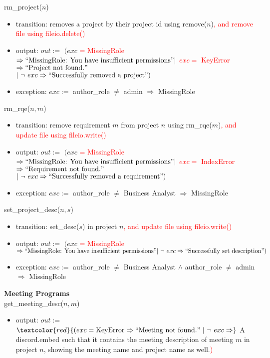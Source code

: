 \documentclass[12pt, titlepage]{article}
\begin{document}
\noindent rm\_project($n$)
\begin{itemize}
    \item transition: removes a project by their project id using remove($n$)\textcolor{red}{, and remove file using fileio.delete()}
    \item output: $out :=$ $(exc$ \textcolor{red}{= MissingRole} $\Rightarrow ``\text{MissingRole: You have insufficient permissions}"\\ |\ $\textcolor{red}{$exc =$ KeyError $\Rightarrow ``\text{Project not found.}"$}\\$|\ \lnot\ exc \Rightarrow ``\text{Successfully removed a project}")$
    \item exception: $exc :=$ author\_role $\neq$ admin $\Rightarrow$ MissingRole
\end{itemize}

\noindent rm\_rqe($n, m$)
\begin{itemize}
    \item transition: remove requirement $m$ from project $n$ using rm\_rqe($m$)\textcolor{red}{, and update file using fileio.write()}
    \item output: $out :=$ $(exc$ \textcolor{red}{= MissingRole} $\Rightarrow ``\text{MissingRole: You have insufficient permissions}"\\ |\ $\textcolor{red}{$exc =$ IndexError $\Rightarrow ``\text{Requirement not found.}"$}\\$|\ \lnot\ exc \Rightarrow ``\text{Successfully removed a requirement}")$
    \item exception: $exc :=$ author\_role $\neq$ Business Analyst $\Rightarrow$ MissingRole
\end{itemize}

\noindent set\_project\_desc($n, s$)
\begin{itemize}
    \item transition: set\_desc($s$) in project $n$\textcolor{red}{, and update file using fileio.write()}
    \item output: $out :=$ $(exc$ \textcolor{red}{= MissingRole} $\Rightarrow ``\text{MissingRole: You have insufficient permissions}"\\ |\ \lnot\ exc \Rightarrow ``\text{Successfully set description}")$
    \item exception: $exc :=$ author\_role $\neq$ Business Analyst $\land$ author\_role $\neq$ admin $\Rightarrow$ MissingRole
\end{itemize}

\noindent \textbf{Meeting Programs\\}
\noindent get\_meeting\_desc($n, m$)
\begin{itemize}
    \item output: $out :=$ $\textcolor{red}{(exc = \text{KeyError} \Rightarrow ``\text{Meeting not found.}"\ |\ \lnot\ exc \Rightarrow}$ A discord.embed such that it contains the meeting description of meeting $m$ in project $n$, showing the meeting name and project name as well.\textcolor{red}{)}
\end{itemize}
\end{document}

